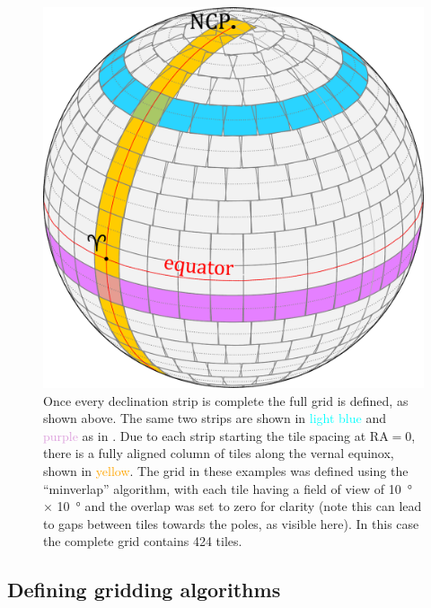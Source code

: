 \begin{colsection}
\begin{colsection}
\begin{figure}[p]
\begin{center}
\includegraphics[width=\linewidth]{images/globe4.pdf}
\end{center}
\caption[A fully tiled sphere]{Once every declination strip is complete the full grid is defined, as shown above. The same two strips are shown in \textcolor{cyan}{light blue} and \textcolor{Plum}{purple} as in . Due to each strip starting the tile spacing at RA$=0$, there is a fully aligned column of tiles along the vernal equinox, shown in \textcolor{orange}{yellow}. The grid in these examples was defined using the ``minverlap'' algorithm, with each tile having a field of view of \SI{10}{\degree} $\times$ \SI{10}{\degree} and the overlap was set to zero for clarity (note this can lead to gaps between tiles towards the poles, as visible here). In this case the complete grid contains 424 tiles.
}
\label{fig:tiledsphere}
\end{figure}

\newpage

\end{colsection}


\subsection{Defining gridding algorithms}
\label{sec:algorithms}
\begin{colsection}


\end{colsection}
\end{colsection}
